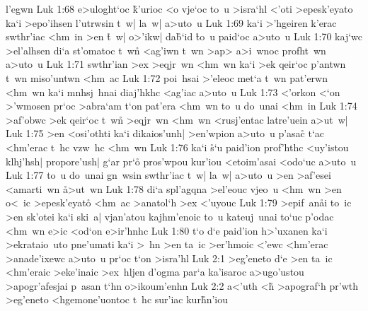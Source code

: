 l'egwn\bibvsend
\vs Luk 1:68
e>uloght`oc
\r{k}'urioc
<o
vje`oc
to~u
>isra`hl
<'oti
>epesk'eyato
ka`i
>epo'ihsen
l'utrwsin
t~w|
la~w|
a>uto~u\bibvsend
\vs Luk 1:69
ka`i
>'hgeiren
k'erac
swthr'iac
<hm~in
>en
\r{t}~w|
o>'ikw|
da\r{b}`id
\r{t}o~u
paid`oc
a>uto~u\bibvsend
\vs Luk 1:70
kaj`wc
>el'alhsen
di`a
st'omatoc
t~wn\r{}
<ag'iwn
t~wn
>ap>
a>i~wnoc
profht~wn
a>uto~u\bibvsend
\vs Luk 1:71
swthr'ian
>ex
>eqjr~wn
<hm~wn
ka`i
>ek
qeir`oc
p'antwn
t~wn
miso'untwn
<hm~ac\bibvsend
\vs Luk 1:72
poi~hsai
>'eleoc
met`a
t~wn
pat'erwn
<hm~wn
ka`i
mnhsj~hnai
diaj'hkhc
<ag'iac
a>uto~u\bibvsend
\vs Luk 1:73
<'orkon
<`on
>'wmosen
pr`oc
>abra`am
t`on
pat'era
<hm~wn
to~u
do~unai
<hm~in\bibvsend
\vs Luk 1:74
>af'obwc
>ek
qeir`oc
t~wn\r{}
>eqjr~wn
<hm~wn
<rusj'entac
latre'uein
a>ut~w|\bibvsend
\vs Luk 1:75
>en
<osi'othti
ka`i
dikaios'unh|
>en'wpion
a>uto~u
p'asac\r{}
t`ac
<hm'erac
t~hc
vzw~hc
<hm~wn\bibvsend
\vs Luk 1:76
ka`i
\r{s}`u
paid'ion
prof'hthc
<uy'istou
klhj'hsh|
propore'ush|
g`ar
pr`o\r{}
pros'wpou
kur'iou
<etoim'asai
<odo`uc
a>uto~u\bibvsend
\vs Luk 1:77
to~u
do~unai
gn~wsin
swthr'iac
t~w|
la~w|
a>uto~u
>en
>af'esei
<amarti~wn
\r{a}>ut~wn\bibvsend
{}
\vs Luk 1:78
di`a
spl'agqna
>el'eouc
vjeo~u
<hm~wn
>en
o<~ic
>epesk'eyat\r{o}
<hm~ac
>anatol`h
>ex
<'uyouc\bibvsend
\vs Luk 1:79
>epif~an\r{a}i
to~ic
>en
sk'otei
ka`i
ski~a|
vjan'atou
kajhm'enoic
to~u
kateuj~unai
to`uc
p'odac
<hm~wn
e>ic
<od`on
e>ir'hnhc\bibvsend
\vs Luk 1:80
t`o
d`e
paid'ion
h>'uxanen
ka`i
>ekrataio~uto
pne'umati
ka`i
>~hn
>en
ta~ic
>er'hmoic
<'ewc
<hm'erac
>anade'ixewc
a>uto~u
pr`oc
t`on
>isra'hl\bibvsend
\vs Luk 2:1
>eg'eneto
d`e
>en
ta~ic
<hm'eraic
>eke'inaic
>ex~hljen
d'ogma
par`a
ka'isaroc
a>ugo'ustou
>apogr'afesjai
p~asan
t`hn
o>ikoum'enhn\bibvsend
\vs Luk 2:2
a<'uth
<h\r{}
>apograf`h
pr'wth
>eg'eneto
<hgemone'uontoc
t~hc
sur'iac
kur\r{h}n'iou\bibvsend
